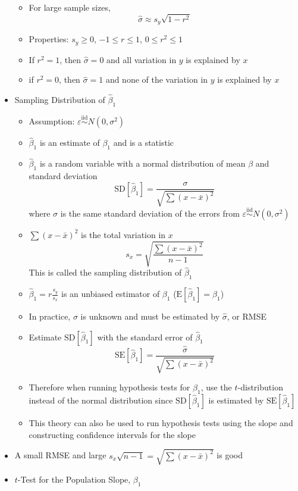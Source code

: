 \documentclass[12pt]{article}
\begin{document}
\begin{itemize}
\begin{itemize}
\item For large sample sizes, $$ \hat{\sigma} \approx s_y \sqrt{1-r^2} $$ 
\item Properties: $s_y \geq 0$, $-1 \leq r \leq 1$, $0 \leq r^2 \leq 1$ 
\item If $r^2 = 1$, then $\hat{\sigma} = 0$ and all variation in $y$ is explained by $x$ 
\item if $r^2 = 0$, then $\hat{\sigma} = 1$ and none of the variation in $y$ is explained by $x$ \end{itemize}
\item Sampling Distribution of $\hat{\beta}_1$ \begin{itemize} 
\item Assumption: $\varepsilon \stackrel{\text{iid}}{\sim} N(0, \sigma^2)$ 
\item $\hat{\beta}_1$ is an estimate of $\beta_1$ and is a statistic 
\item $\hat{\beta}_1$ is a random variable with a normal distribution of mean $\beta$ and standard deviation $$ \text{SD}[\hat{\beta}_1] = \frac{\sigma}{\sqrt{ \sum (x - \bar{x})^2}} $$ where $\sigma$ is the same standard deviation of the errors from $\varepsilon \stackrel{\text{iid}}{\sim} N(0, \sigma^2)$  
\item $\sum (x - \bar{x})^2$ is the total variation in $x$ $$ s_x = \sqrt{ \frac{\sum (x - \bar{x})^2}{n-1}} $$ This is called the sampling distribution of $\hat{\beta}_1$ 
\item $\hat{\beta}_1 = r\frac{s_y}{s_x}$ is an unbiased estimator of $\beta_1$ ($\text{E}[\hat{\beta}_1] = \beta_1$)
\item In practice, $\sigma$ is unknown and must be estimated by $\hat{\sigma}$, or RMSE 
\item Estimate $\text{SD}[\hat{\beta}_1]$ with the standard error of $\hat{\beta}_1$
$$ \text{SE}[\hat{\beta}_1] = \frac{\hat{\sigma}}{\sqrt{\sum (x - \bar{x})^2}} $$ 
\item Therefore when running hypothesis tests for $\beta_1$, use the $t$-distribution instead of the normal distribution since $\text{SD}[\hat{\beta}_1]$ is estimated by $\text{SE}[\hat{\beta}_1]$ 
\item This theory can also be used to run hypothesis tests using the slope and constructing confidence intervals for the slope \end{itemize} 
\item A small RMSE and large $s_x \sqrt{n-1} = \sqrt{\sum (x - \bar{x})^2} $ is good
\item $t$-Test for the Population Slope, $\beta_1$ \begin{itemize} 

\end{itemize}
\end{itemize}
\end{document}
